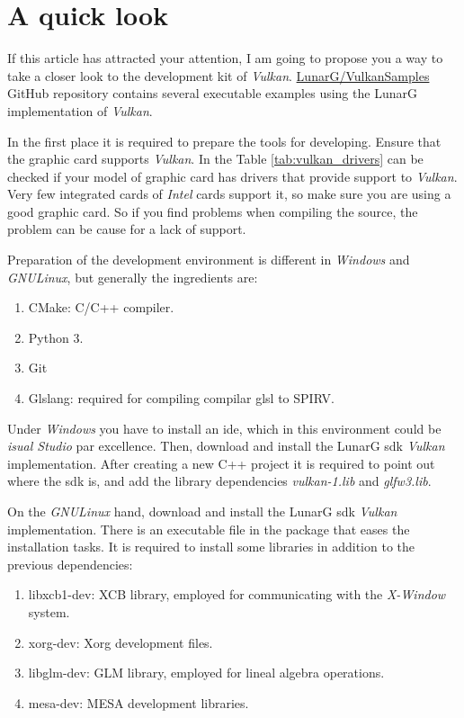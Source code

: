 \chapter{A quick look}
If this article has attracted your attention, I am going to propose you a way to take a closer look to the development
kit of \emph{Vulkan}. \href{https://github.com/LunarG/VulkanSamples}{LunarG/VulkanSamples} GitHub repository contains
several executable examples using the LunarG implementation of \emph{Vulkan}.

In the first place it is required to prepare the tools for developing. Ensure that the graphic card supports
\emph{Vulkan}. In the Table \ref{tab:vulkan_drivers} can be checked if your model of graphic card has drivers that
provide support to \emph{Vulkan}. Very few integrated cards of \emph{Intel} cards support it, so make sure you are
using a good graphic card. So if you find problems when compiling the source, the problem can be cause for a lack
of support.

Preparation of the development environment is different in \emph{Windows} and \emph{GNU\/Linux}, but generally the
ingredients are:
\begin{enumerate}
    \item CMake: C/C++ compiler.
    \item Python 3.
    \item Git
    \item Glslang: required for compiling compilar \gls{glsl} to SPIRV.
\end{enumerate}

Under \emph{Windows} you have to install an \gls{ide}, which in this environment could be \emph{isual Studio} par
excellence. Then, download and install the LunarG \gls{sdk} \emph{Vulkan} implementation. After creating a new C++
project it is required to point out where the \gls{sdk} is, and add the library dependencies \emph{vulkan-1.lib} and
\emph{glfw3.lib}.

On the \emph{GNU\/Linux} hand, download and install the LunarG \gls{sdk} \emph{Vulkan} implementation. There is an
executable file in the package that eases the installation tasks. It is required to install some libraries in addition
to the previous dependencies:
\begin{enumerate}
    \item libxcb1-dev: XCB library, employed for communicating with the \emph{X-Window} system.
    \item xorg-dev: Xorg development files.
    \item libglm-dev: GLM library, employed for lineal algebra operations.
    \item mesa-dev: MESA development libraries.
\end{enumerate}

